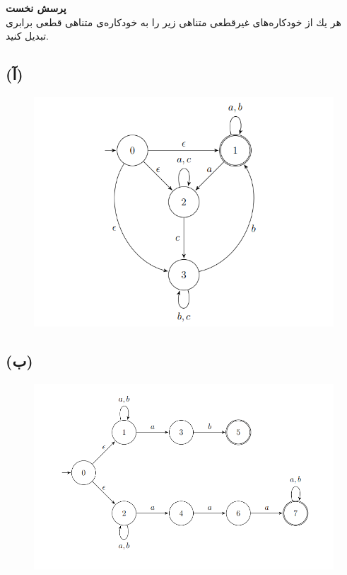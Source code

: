 \textbf{پرسش نخست}\\[0.1in]
هر يك از خودكاره‌های غيرقطعی متناهی زير را به خودكاره‌ی متناهی قطعی برابری تبديل كنيد.
\subsection*{(آ)}
\begin{figure} [H]
    \centering
    \includegraphics[scale=0.6]{questions/1-1.png}
\end{figure}
\subsection*{(ب)}
\begin{figure} [H]
    \centering
    \includegraphics[scale=0.6]{questions/1-2.png}
\end{figure}